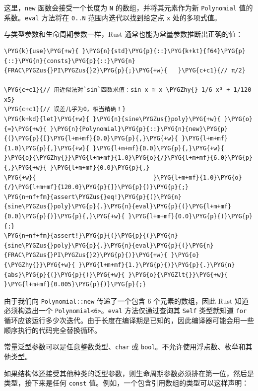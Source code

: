 这里，\texttt{new} 函数会接受一个长度为 \texttt{N} 的数组，并将其元素作为新 \texttt{Polynomial} 值的系数。\texttt{eval} 方法将在 \texttt{0..N} 范围内迭代以找到给定点 \texttt{x} 处的多项式值。

与类型参数和生命周期参数一样，Rust 通常也能为常量参数推断出正确的值：

\begin{Verbatim}[commandchars=\\\{\},breaklines=true,breakanywhere=true,fontsize=\codefont,xleftmargin=17bp]
\PYG{k}{use}\PYG{+w}{ }\PYG{n}{std}\PYG{p}{::}\PYG{k+kt}{f64}\PYG{p}{::}\PYG{n}{consts}\PYG{p}{::}\PYG{n}{FRAC\PYGZus{}PI\PYGZus{}2}\PYG{p}{;}\PYG{+w}{   }\PYG{c+c1}{// π/2}

\PYG{c+c1}{// 用近似法对`sin`函数求值：sin x ≅ x \PYGZhy{} 1/6 x³ + 1/120 x5}
\PYG{c+c1}{// 误差几乎为0，相当精确！}
\PYG{k+kd}{let}\PYG{+w}{ }\PYG{n}{sine\PYGZus{}poly}\PYG{+w}{ }\PYG{o}{=}\PYG{+w}{ }\PYG{n}{Polynomial}\PYG{p}{::}\PYG{n}{new}\PYG{p}{(}\PYG{p}{[}\PYG{l+m+mf}{0.0}\PYG{p}{,}\PYG{+w}{ }\PYG{l+m+mf}{1.0}\PYG{p}{,}\PYG{+w}{ }\PYG{l+m+mf}{0.0}\PYG{p}{,}\PYG{+w}{ }\PYG{o}{\PYGZhy{}}\PYG{l+m+mf}{1.0}\PYG{o}{/}\PYG{l+m+mf}{6.0}\PYG{p}{,}\PYG{+w}{ }\PYG{l+m+mf}{0.0}\PYG{p}{,}
\PYG{+w}{                                 }\PYG{l+m+mf}{1.0}\PYG{o}{/}\PYG{l+m+mf}{120.0}\PYG{p}{]}\PYG{p}{)}\PYG{p}{;}
\PYG{n+nf+fm}{assert\PYGZus{}eq!}\PYG{p}{(}\PYG{n}{sine\PYGZus{}poly}\PYG{p}{.}\PYG{n}{eval}\PYG{p}{(}\PYG{l+m+mf}{0.0}\PYG{p}{)}\PYG{p}{,}\PYG{+w}{ }\PYG{l+m+mf}{0.0}\PYG{p}{)}\PYG{p}{;}
\PYG{n+nf+fm}{assert!}\PYG{p}{(}\PYG{p}{(}\PYG{n}{sine\PYGZus{}poly}\PYG{p}{.}\PYG{n}{eval}\PYG{p}{(}\PYG{n}{FRAC\PYGZus{}PI\PYGZus{}2}\PYG{p}{)}\PYG{+w}{ }\PYG{o}{\PYGZhy{}}\PYG{+w}{ }\PYG{l+m+mf}{1.}\PYG{p}{)}\PYG{p}{.}\PYG{n}{abs}\PYG{p}{(}\PYG{p}{)}\PYG{+w}{ }\PYG{o}{\PYGZlt{}}\PYG{+w}{ }\PYG{l+m+mf}{0.005}\PYG{p}{)}\PYG{p}{;}
\end{Verbatim}

由于我们向 \texttt{Polynomial::new} 传递了一个包含 6 个元素的数组，因此 Rust 知道必须构造出一个 \texttt{Polynomial<6>}。\texttt{eval} 方法仅通过查询其 \texttt{Self} 类型就知道 \texttt{for} 循环应该运行多少次迭代。由于长度在编译期是已知的，因此编译器可能会用一些顺序执行的代码完全替换循环。

常量泛型参数可以是任意整数类型、\texttt{char} 或 \texttt{bool}。不允许使用浮点数、枚举和其他类型。

如果结构体还接受其他种类的泛型参数，则生命周期参数必须排在第一位，然后是类型，接下来是任何 \texttt{const} 值。例如，一个包含引用数组的类型可以这样声明：

